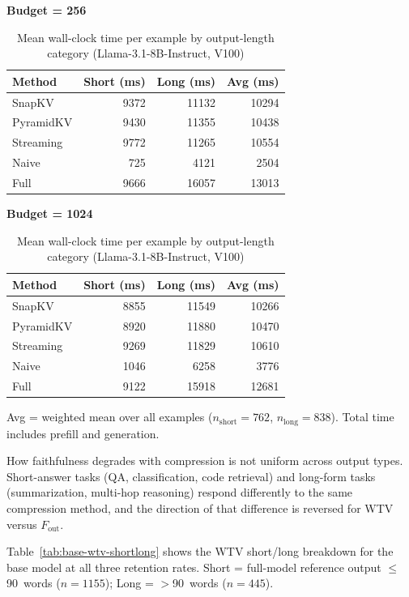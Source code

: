 \documentclass[10pt,letterpaper]{article}
\begin{document}
\begin{table}[H]
\centering
\small
\caption{Mean wall-clock time per example by output-length category (Llama-3.1-8B-Instruct, V100)}
\label{tab:instruct-timing}
\begin{minipage}[t]{0.47\textwidth}
\centering
\textbf{Budget = 256}\\[4pt]
\begin{tabular}{@{}lrrr@{}}
\toprule
Method & Short (ms) & Long (ms) & Avg (ms)\\
\midrule
SnapKV    &  9372 & 11132 & 10294\\
PyramidKV &  9430 & 11355 & 10438\\
Streaming &  9772 & 11265 & 10554\\
Naive     &   725 &  4121 &  2504\\
Full      &  9666 & 16057 & 13013\\
\bottomrule
\end{tabular}
\end{minipage}
\hfill
\begin{minipage}[t]{0.47\textwidth}
\centering
\textbf{Budget = 1024}\\[4pt]
\begin{tabular}{@{}lrrr@{}}
\toprule
Method & Short (ms) & Long (ms) & Avg (ms)\\
\midrule
SnapKV    &  8855 & 11549 & 10266\\
PyramidKV &  8920 & 11880 & 10470\\
Streaming &  9269 & 11829 & 10610\\
Naive     &  1046 &  6258 &  3776\\
Full      &  9122 & 15918 & 12681\\
\bottomrule
\end{tabular}
\end{minipage}

\medskip
Avg = weighted mean over all examples ($n_{\text{short}}=762$, $n_{\text{long}}=838$).
Total time includes prefill and generation.
\end{table}

How faithfulness degrades with compression is not uniform across output types.
Short-answer tasks (QA, classification, code retrieval) and long-form tasks
(summarization, multi-hop reasoning) respond differently to the same compression method,
and the direction of that difference is reversed for WTV versus \(F_{\text{out}}\).

Table~\ref{tab:base-wtv-shortlong} shows the WTV short/long breakdown for the base
model at all three retention rates.
Short = full-model reference output $\leq$90~words ($n=1155$);
Long = $>$90~words ($n=445$).
\end{document}
